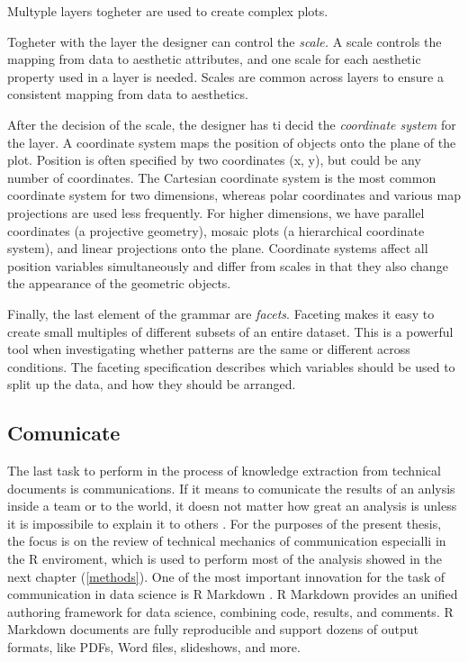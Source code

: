 \documentclass[]{book}
\begin{document}
Multyple layers togheter are used to create complex plots.

Togheter with the layer the designer can control the \emph{scale.} A
scale controls the mapping from data to aesthetic attributes, and one
scale for each aesthetic property used in a layer is needed. Scales are
common across layers to ensure a consistent mapping from data to
aesthetics.

After the decision of the scale, the designer has ti decid the
\emph{coordinate system} for the layer. A coordinate system maps the
position of objects onto the plane of the plot. Position is often
specified by two coordinates (x, y), but could be any number of
coordinates. The Cartesian coordinate system is the most common
coordinate system for two dimensions, whereas polar coordinates and
various map projections are used less frequently. For higher dimensions,
we have parallel coordinates (a projective geometry), mosaic plots (a
hierarchical coordinate system), and linear projections onto the plane.
Coordinate systems affect all position variables simultaneously and
differ from scales in that they also change the appearance of the
geometric objects.

Finally, the last element of the grammar are \emph{facets}. Faceting
makes it easy to create small multiples of different subsets of an
entire dataset. This is a powerful tool when investigating whether
patterns are the same or different across conditions. The faceting
specification describes which variables should be used to split up the
data, and how they should be arranged.

\subsection{Comunicate}\label{sotatoolscomunicate}

The last task to perform in the process of knowledge extraction from
technical documents is communications. If it means to comunicate the
results of an anlysis inside a team or to the world, it doesn not matter
how great an analysis is unless it is impossibile to explain it to
others \citep{wickham2016r}. For the purposes of the present thesis, the
focus is on the review of technical mechanics of communication
especialli in the R \citep{R-base} enviroment, which is used to perform
most of the analysis showed in the next chapter (\ref{methods}). One of
the most important innovation for the task of communication in data
science is R Markdown \citep{R-rmarkdown}. R Markdown provides an
unified authoring framework for data science, combining code, results,
and comments. R Markdown documents are fully reproducible and support
dozens of output formats, like PDFs, Word files, slideshows, and more.
\end{document}
